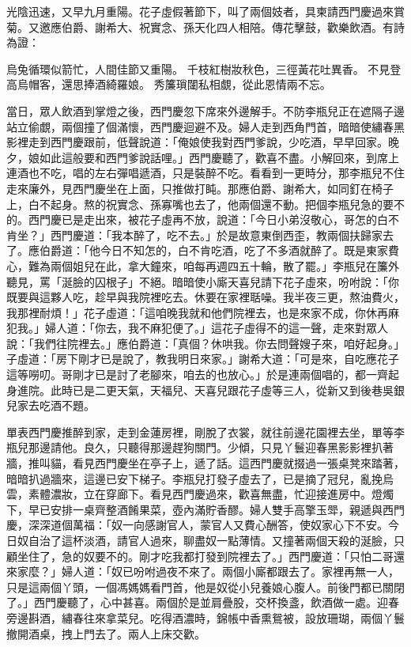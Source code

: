 光陰迅速，又早九月重陽。花子虛假著節下，叫了兩個妓者，具柬請西門慶過來賞菊。又邀應伯爵、謝希大、祝實念、孫天化四人相陪。傳花擊鼓，歡樂飲酒。有詩為證：

烏兔循環似箭忙，人間佳節又重陽。
千枝紅樹妝秋色，三徑黃花吐異香。
不見登高烏帽客，還思捧酒綺羅娘。
秀簾瑣闥私相覷，從此恩情兩不忘。

當日，眾人飲酒到掌燈之後，西門慶忽下席來外邊解手。不防李瓶兒正在遮隔子邊站立偷覷，兩個撞了個滿懷，西門慶迴避不及。婦人走到西角門首，暗暗使繡春黑影裡走到西門慶跟前，低聲說道：「俺娘使我對西門爹說，少吃酒，早早回家。晚夕，娘如此這般要和西門爹說話哩。」西門慶聽了，歡喜不盡。小解回來，到席上連酒也不吃，唱的左右彈唱遞酒，只是裝醉不吃。看看到一更時分，那李瓶兒不住走來廉外，見西門慶坐在上面，只推做打盹。那應伯爵、謝希大，如同釘在椅子上，白不起身。熬的祝實念、孫寡嘴也去了，他兩個還不動。把個李瓶兒急的要不的。西門慶已是走出來，被花子虛再不放，說道：「今日小弟沒敬心，哥怎的白不肯坐？」西門慶道：「我本醉了，吃不去。」於是故意東倒西歪，教兩個扶歸家去了。應伯爵道：「他今日不知怎的，白不肯吃酒，吃了不多酒就醉了。既是東家費心，難為兩個姐兒在此，拿大鐘來，咱每再週四五十輪，散了罷。」李瓶兒在簾外聽見，罵「涎臉的囚根子」不絕。暗暗使小廝天喜兒請下花子虛來，吩咐說：「你既要與這夥人吃，趁早與我院裡吃去。休要在家裡聒噪。我半夜三更，熬油費火，我那裡耐煩！」花子虛道：「這咱晚我就和他們院裡去，也是來家不成，你休再麻犯我。」婦人道：「你去，我不麻犯便了。」這花子虛得不的這一聲，走來對眾人說：「我們往院裡去。」應伯爵道：「真個？休哄我。你去問聲嫂子來，咱好起身。」子虛道：「房下剛才已是說了，教我明日來家。」謝希大道：「可是來，自吃應花子這等嘮叨。哥剛才已是討了老腳來，咱去的也放心。」於是連兩個唱的，都一齊起身進院。此時已是二更天氣，天福兒、天喜兒跟花子虛等三人，從新又到後巷吳銀兒家去吃酒不題。

單表西門慶推醉到家，走到金蓮房裡，剛脫了衣裳，就往前邊花園裡去坐，單等李瓶兒那邊請他。良久，只聽得那邊趕狗關門。少傾，只見丫鬟迎春黑影影裡扒著牆，推叫貓，看見西門慶坐在亭子上，遞了話。這西門慶就掇過一張桌凳來踏著，暗暗扒過牆來，這邊已安下梯子。李瓶兒打發子虛去了，已是摘了冠兒，亂挽烏雲，素體濃妝，立在穿廊下。看見西門慶過來，歡喜無盡，忙迎接進房中。燈燭下，早已安排一桌齊整酒餚果菜，壺內滿貯香醪。婦人雙手高擎玉斝，親遞與西門慶，深深道個萬福：「奴一向感謝官人，蒙官人又費心酬答，使奴家心下不安。今日奴自治了這杯淡酒，請官人過來，聊盡奴一點薄情。又撞著兩個天殺的涎臉，只顧坐住了，急的奴要不的。剛才吃我都打發到院裡去了。」西門慶道：「只怕二哥還來家麼？」婦人道：「奴已吩咐過夜不來了。兩個小廝都跟去了。家裡再無一人，只是這兩個丫頭，一個馮媽媽看門首，他是奴從小兒養娘心腹人。前後門都已關閉了。」西門慶聽了，心中甚喜。兩個於是並肩疊股，交杯換盞，飲酒做一處。迎春旁邊斟酒，繡春往來拿菜兒。吃得酒濃時，錦帳中香熏鴛被，設放珊瑚，兩個丫鬟撤開酒桌，拽上門去了。兩人上床交歡。

